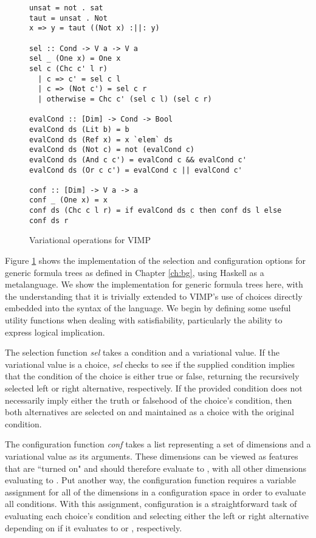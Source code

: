 \documentclass[12pt,oneside]{book}
\begin{document}
\begin{figure}
\begin{lstlisting}
unsat = not . sat
taut = unsat . Not
x => y = taut ((Not x) :||: y)

sel :: Cond -> V a -> V a
sel _ (One x) = One x
sel c (Chc c' l r)
  | c => c' = sel c l
  | c => (Not c') = sel c r
  | otherwise = Chc c' (sel c l) (sel c r)
  
evalCond :: [Dim] -> Cond -> Bool
evalCond ds (Lit b) = b
evalCond ds (Ref x) = x `elem` ds
evalCond ds (Not c) = not (evalCond c)
evalCond ds (And c c') = evalCond c && evalCond c'
evalCond ds (Or c c') = evalCond c || evalCond c'

conf :: [Dim] -> V a -> a
conf _ (One x) = x
conf ds (Chc c l r) = if evalCond ds c then conf ds l else conf ds r
\end{lstlisting}
\caption{Variational operations for VIMP}
\label{fig:varops}
\end{figure}

Figure \ref{fig:varops} shows the implementation of the selection and configuration options for generic formula trees
as defined in Chapter \ref{ch:bg}, using Haskell as a metalanguage. We show the implementation for generic formula trees
here, with the understanding that it is trivially extended to VIMP's use of choices directly embedded into the syntax of the language.
We begin by defining some useful utility functions when dealing with satisfiability, particularly the ability to express logical implication.

The selection function \emph{sel} takes a condition and a variational value. If the variational value is a choice, \emph{sel} checks to see
if the supplied condition implies that the condition of the choice is either true or false, returning the recursively selected left or right alternative, respectively.
If the provided condition does not necessarily imply either the truth or falsehood of the choice's condition, then both alternatives are selected on
and maintained as a choice with the original condition.

The configuration function \emph{conf} takes a list representing a set of dimensions and a variational value as its arguments. These dimensions can be viewed as
features that are ``turned on" and should therefore evaluate to , with all other dimensions evaluating to . Put another way, the configuration
function requires a variable assignment for all of the dimensions in a configuration space in order to evaluate all conditions. With this assignment, configuration
is a straightforward task of evaluating each choice's condition and selecting either the left or right alternative depending on if it evaluates to  or , respectively.
\end{document}
